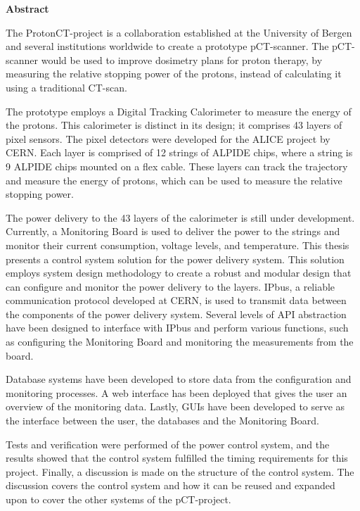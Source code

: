 \documentclass[main.tex]{subfiles}
\begin{document}
\normalsize
 \vspace*{30pt}
 \begin{center}

\textbf{Abstract}\\ 

\hspace{10pt}

\end{center}
\normalsize
The ProtonCT-project is a collaboration established at the University of Bergen and several institutions worldwide to create a prototype pCT-scanner. The pCT-scanner would be used to improve dosimetry plans for proton therapy, by measuring the relative stopping power of the protons, instead of calculating it using a traditional CT-scan.

The prototype employs a Digital Tracking Calorimeter to measure the energy of the protons. This calorimeter is distinct in its design; it comprises 43 layers of pixel sensors. The pixel detectors were developed for the ALICE project by CERN. Each layer is comprised of 12 strings of ALPIDE chips, where a string is 9 ALPIDE chips mounted on a flex cable. These layers can track the trajectory and measure the energy of protons, which can be used to measure the relative stopping power. 

The power delivery to the 43 layers of the calorimeter is still under development. Currently, a Monitoring Board is used to deliver the power to the strings and monitor their current consumption, voltage levels, and temperature. This thesis presents a control system solution for the power delivery system. This solution employs system design methodology to create a robust and modular design that can configure and monitor the power delivery to the layers. IPbus, a reliable communication protocol developed at CERN, is used to transmit data between the components of the power delivery system. Several levels of API abstraction have been designed to interface with IPbus and perform various functions, such as configuring the Monitoring Board and monitoring the measurements from the board.

Database systems have been developed to store data from the configuration and monitoring processes. A web interface has been deployed that gives the user an overview of the monitoring data. Lastly, GUIs have been developed to serve as the interface between the user, the databases and the Monitoring Board.

Tests and verification were performed of the power control system, and the results showed that the control system fulfilled the timing requirements for this project. Finally, a discussion is made on the structure of the control system. The discussion covers the control system and how it can be reused and expanded upon to cover the other systems of the pCT-project.
\end{document}
